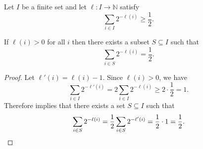 \begin{corollary} \label{cor:aux}
Let $I$ be a finite set and let $\ell\colon I \to \mathbb{N}$ satisfy
\[
 \sum_{i \in I} 2^{-\ell(i)} \geq \frac{1}{2}.
\]

If $\ell(i) > 0$ for all $i$ then there exists a subset $S \subseteq I$ such that
\[
 \sum_{i \in S} 2^{-\ell(i)} = \frac{1}{2}.
\]
\end{corollary}
\begin{proof}
Let $\ell'(i) = \ell(i) - 1$. Since $\ell(i) > 0$, we have
\[
 \sum_{i \in I} 2^{-\ell'(i)} =
 2\sum_{i \in I} 2^{-\ell(i)} \geq 2 \cdot \frac{1}{2} = 1.
\]
Therefore  implies that there exists a set $S \subseteq I$ such that
\[
 \sum_{i \in S} 2^{-\ell(i)} = \frac{1}{2} \sum_{i \in S} 2^{-\ell'(i)} = \frac{1}{2} \cdot 1 = \frac{1}{2}. \qedhere
\]
\end{proof}

